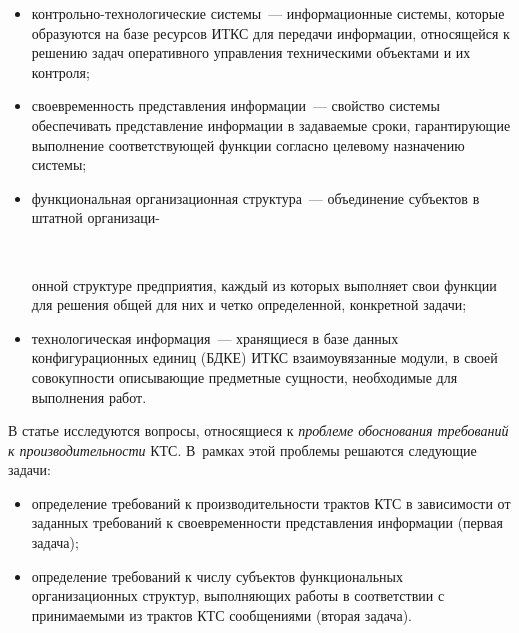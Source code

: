 \begin{multicols}{2}
\begin{itemize}
{}
\item контрольно-технологические сис\-те\-мы~--- информационные сис\-те\-мы, которые 
образуются на базе ресурсов ИТКС для передачи информации, относящейся к решению 
задач оперативного управления техническими объектами и их контроля;
\item своевременность представления информации~--- свойство сис\-те\-мы обеспечивать 
представление информации в задаваемые сроки, гарантирующие выполнение 
соответствующей функции согласно целевому назначению сис\-те\-мы;
\item функциональная организационная структура~--- объединение субъектов в штатной 
организаци-\linebreak\vspace*{-12pt}

\setcounter{figure}{1}
\begin{figure*}[b] %
\vspace*{1pt}
\begin{center}
\mbox{%
\epsfxsize=122.607mm
}
\end{center}
\vspace*{-9pt}
\end{figure*}

\pagebreak

\noindent
онной структуре предприятия, каждый из которых выполняет свои функции 
для решения общей для них и четко определенной, конкретной задачи;
\item технологическая информация~--- храня\-щи\-еся в базе данных конфигурационных 
единиц (\mbox{БДКЕ}) ИТКС взаимоувязанные модули, в своей совокупности описывающие 
предметные сущности, необходимые для выполнения работ.
{

}
     \end{itemize}
     
     В статье исследуются вопросы, относящиеся к \textit{проблеме обоснования 
требований к производительности} КТС. В~рамках этой проблемы решаются следующие 
задачи:
     \begin{itemize}
\item определение требований к произво\-ди\-тель\-ности трактов КТС в зависимости от 
заданных требований к своевременности представления информации (первая задача);
\item определение требований к числу субъектов функциональных организационных 
структур, выполняющих работы в соответствии с принимаемыми из трактов КТС 
сообщениями (вторая задача).
     \end{itemize}
     

\end{multicols}
